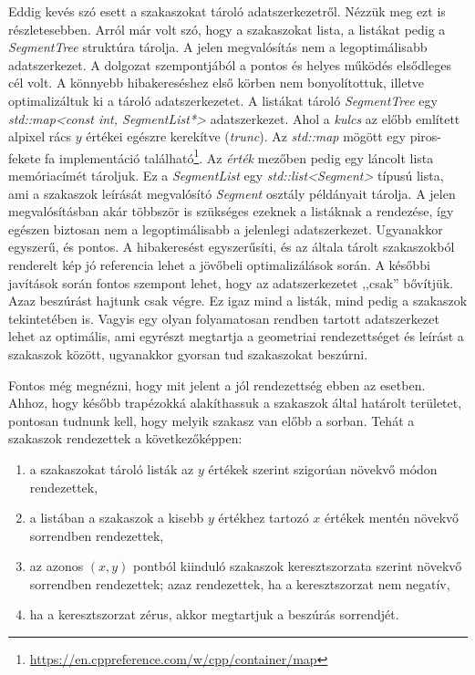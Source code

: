\documentclass[12pt]{report}
\theoremstyle{definition}
\newcommand{\func}[1]{{\textsl{#1}}}
\begin{document}
Eddig kevés szó esett a szakaszokat tároló adatszerkezetről. Nézzük meg ezt is
részletesebben. Arról már volt szó, hogy a szakaszokat lista, a listákat pedig
a \func{SegmentTree} struktúra tárolja. A jelen megvalósítás nem a
legoptimálisabb adatszerkezet. A dolgozat szempontjából a pontos és helyes
működés elsődleges cél volt. A könnyebb hibakereséshez első körben nem
bonyolítottuk, illetve optimalizáltuk ki a tároló adatszerkezetet. A listákat
tároló \func{SegmentTree} egy \func{std::map<const int, SegmentList*>}
adatszerkezet. Ahol a \emph{kulcs} az előbb említett alpixel rács $y$ értékei
egészre kerekítve (\func{trunc}). Az \func{std::map} mögött egy piros-fekete fa
implementáció található\footnote{
{\footnotesize\url{https://en.cppreference.com/w/cpp/container/map}}}. Az
\emph{érték} mezőben pedig egy láncolt lista memóriacímét tároljuk. Ez a
\func{SegmentList} egy \func{std::list<Segment>} típusú lista, ami a szakaszok
leírását megvalósító \func{Segment} osztály példányait tárolja. A jelen
megvalósításban akár többször is szükséges ezeknek a listáknak a rendezése, így
egészen biztosan nem a legoptimálisabb a jelenlegi adatszerkezet. Ugyanakkor
egyszerű, és pontos. A hibakeresést egyszerűsíti, és az általa tárolt
szakaszokból renderelt kép jó referencia lehet a jövőbeli optimalizálások
során. A későbbi javítások során fontos szempont lehet, hogy az adatszerkezetet
,,csak'' bővítjük. Azaz beszúrást hajtunk csak végre. Ez igaz mind a listák,
mind pedig a szakaszok tekintetében is. Vagyis egy olyan folyamatosan rendben
tartott adatszerkezet lehet az optimális, ami egyrészt megtartja a geometriai
rendezettséget és leírást a szakaszok között, ugyanakkor gyorsan tud
szakaszokat beszúrni.

Fontos még megnézni, hogy mit jelent a jól rendezettség ebben az esetben.
Ahhoz, hogy később trapézokká alakíthassuk a szakaszok által határolt
területet, pontosan tudnunk kell, hogy melyik szakasz van előbb a sorban. Tehát
a szakaszok rendezettek a következőképpen:
  \begin{enumerate}
    \item a szakaszokat tároló listák az $y$ értékek szerint szigorúan
    növekvő módon rendezettek,
    \item a listában a szakaszok a kisebb $y$ értékhez tartozó $x$
    értékek mentén növekvő sorrendben rendezettek,
    \item az azonos $(x, y)$ pontból kiinduló szakaszok keresztszorzata
    szerint növekvő sorrendben rendezettek; azaz rendezettek, ha a
    keresztszorzat nem negatív,
    \item ha a keresztszorzat zérus, akkor megtartjuk a beszúrás sorrendjét.
  \end{enumerate}
\end{document}
